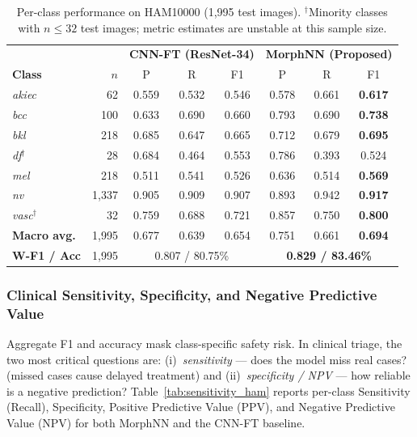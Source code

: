 \documentclass[preprint,12pt]{elsarticle}
\begin{document}
\begin{table}[htbp]
\centering
\caption{Per-class performance on HAM10000 (1,995 test images).
  $^\dagger$Minority classes with $n \leq 32$ test images; metric
  estimates are unstable at this sample size.}
\label{tab:perclass_ham}
\setlength{\tabcolsep}{4pt}
\renewcommand{\arraystretch}{1.12}
\begin{tabular}{lrccc|ccc}
\toprule
 & &
  \multicolumn{3}{c|}{\textbf{CNN-FT (ResNet-34)}} &
  \multicolumn{3}{c}{\textbf{MorphNN (Proposed)}} \\
\textbf{Class} & \textbf{$n$} & P & R & F1 & P & R & F1 \\
\midrule
\textit{akiec} & 62 &
  0.559 & 0.532 & 0.546 & 0.578 & 0.661 & \textbf{0.617} \\
\textit{bcc}   & 100 &
  0.633 & 0.690 & 0.660 & 0.793 & 0.690 & \textbf{0.738} \\
\textit{bkl}   & 218 &
  0.685 & 0.647 & 0.665 & 0.712 & 0.679 & \textbf{0.695} \\
\textit{df}$^\dagger$   & 28 &
  0.684 & 0.464 & 0.553 & 0.786 & 0.393 & 0.524 \\
\textit{mel}   & 218 &
  0.511 & 0.541 & 0.526 & 0.636 & 0.514 & \textbf{0.569} \\
\textit{nv}    & 1{,}337 &
  0.905 & 0.909 & 0.907 & 0.893 & 0.942 & \textbf{0.917} \\
\textit{vasc}$^\dagger$ & 32 &
  0.759 & 0.688 & 0.721 & 0.857 & 0.750 & \textbf{0.800} \\
\midrule
\textbf{Macro avg.} & 1{,}995 &
  0.677 & 0.639 & 0.654 & 0.751 & 0.661 & \textbf{0.694} \\
\textbf{W-F1 / Acc} & 1{,}995 &
  \multicolumn{3}{c|}{0.807 / 80.75\%} &
  \multicolumn{3}{c}{\textbf{0.829 / 83.46\%}} \\
\bottomrule
\end{tabular}
\end{table}


\subsubsection{Clinical Sensitivity, Specificity, and Negative Predictive Value}
\label{sec:sensitivity}

Aggregate F1 and accuracy mask class-specific safety risk.  In clinical
triage, the two most critical questions are: (i)~\emph{sensitivity} ---
does the model miss real cases? (missed cases cause delayed treatment)
and (ii)~\emph{specificity / NPV} --- how reliable is a negative
prediction?  Table~\ref{tab:sensitivity_ham} reports per-class
Sensitivity (Recall), Specificity, Positive Predictive Value (PPV), and
Negative Predictive Value (NPV) for both MorphNN and the CNN-FT baseline.
\end{document}
